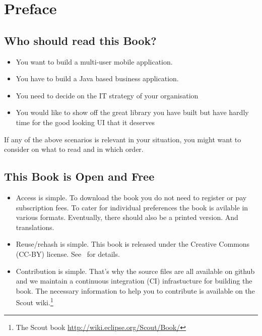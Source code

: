 \documentclass[a4paper,10pt,twoside]{book}
\begin{document}
  \sloppy
\fi


\chapter{Preface}


\section*{Who should read this Book?}

\begin{itemize}
\item You want to build a multi-user mobile application.
\item You have to build a Java based business application. 
\item You need to decide on the IT strategy of your organisation
\item You would like to show off the great library you have built but have hardly time for the good looking UI that it deserves
\end{itemize}

\noindent If any of the above scenarios is relevant in your situation, you might want to consider  on what to read and in which order.

\section*{This Book is Open and Free}

\begin{itemize}
\item Access is simple. 
To download the book you do not need to register or pay subscription fees. 
To cater for individual preferences the book is avilable in various formats. 
Eventually, there should also be a printed version. And translations.

\item Reuse/rehash is simple. 
This book is released under the Creative Commons (CC-BY) license. 
See~ for details.

\item Contribution is simple. 
That's why the source files are all available on github and we maintain a continuous integration (CI) infrastucture for building the book. 
The necessary information to help you to contribute is available on the Scout
wiki.\footnote{The Scout book \url{http://wiki.eclipse.org/Scout/Book/}}
\end{itemize}
\end{document}
